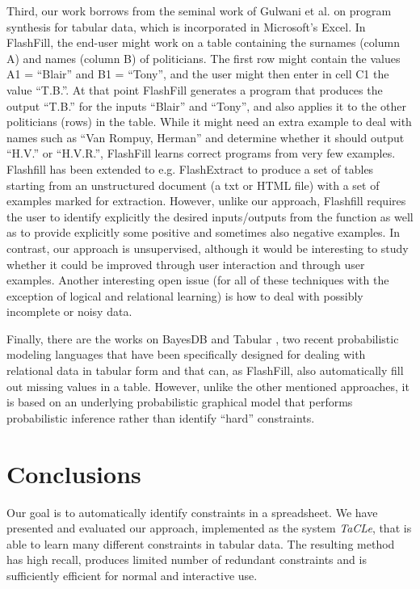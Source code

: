 \documentclass{IEEEtran}
\newcommand{\format}[1]{\textit{#1}\xspace}
\newcommand{\sname}{\format{TaCLe}}
\theoremstyle{definition}
\begin{document}
Third, our work borrows from the seminal work of Gulwani et al. \cite{flashfill} on program synthesis for tabular data, which is incorporated in Microsoft’s Excel. In FlashFill, the end-user might work on a table containing the surnames (column A) and names (column B) of politicians. The first row might contain the values A1 = ``Blair'' and B1 = ``Tony'', and the user might then enter in cell C1 the value ``T.B.''. At that point FlashFill generates a program that produces the output ``T.B.'' for the inputs ``Blair'' and ``Tony'', and also applies it to the other politicians (rows) in the table. While it might need an extra example to deal with names such as ``Van Rompuy, Herman'' and determine whether it should output ``H.V.'' or ``H.V.R.'', FlashFill learns correct programs from very few examples. Flashfill has been extended to e.g. FlashExtract \cite{flashextract} to produce a set of tables starting from an unstructured document (a txt or HTML file) with a set of examples marked for extraction. However, unlike our approach, Flashfill requires the user to identify explicitly the desired inputs/outputs from the function as well as to provide explicitly some positive and sometimes also negative examples.  In contrast, our approach is unsupervised, although it would be interesting to study whether it could be improved through user interaction and through user examples.  Another interesting open issue (for all of these techniques with the exception of logical and relational learning) is how to deal with possibly incomplete or noisy data.

Finally, there are the works on  BayesDB \cite{BayesDB} and Tabular \cite{tabular}, two recent probabilistic modeling languages that have been specifically designed for dealing with relational data in tabular form and that can, as FlashFill, also automatically fill out missing values in a table.  However, unlike the other mentioned approaches, it is based on an underlying probabilistic graphical model that performs probabilistic inference rather than identify ``hard'' constraints.

\section{Conclusions}\label{sec:conclusions}

Our goal is to automatically identify constraints in a spreadsheet.
We have presented and evaluated our approach, implemented as the system \sname, that is able to learn many different constraints in tabular data.
The resulting method has high recall, produces limited number of redundant constraints and is sufficiently efficient for normal and interactive use.
\end{document}
